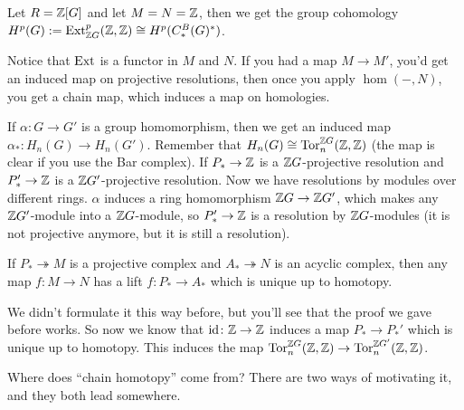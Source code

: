 \begin{example}
 Let $R=\mathbb{Z}[G]$ and let $M=N=\mathbb{Z}$, then we get the group cohomology $H^p(G):=\operatorname{Ext}^p_{\mathbb{Z} G}(\mathbb{Z},\mathbb{Z})\cong H^p(C_*^B(G)^*)$.
\end{example}

Notice that $\operatorname{Ext}$ is a functor in $M$ and $N$. If you had a map $M\to M'$, you'd get an induced map on projective resolutions, then once you apply $\hom(-,N)$, you get a chain map, which induces a map on homologies.

If $\alpha\colon G\to G'$ is a group homomorphism, then we get an induced map $\alpha_*\colon H_n(G)\to H_n(G')$. Remember that $H_n(G)\cong \operatorname{Tor}^{\mathbb{Z} G}_n(\mathbb{Z},\mathbb{Z})$ (the map is clear if you use the Bar complex). If $P_*\to \mathbb{Z}$ is a $\mathbb{Z} G$-projective resolution and $P'_*\to \mathbb{Z}$ is a $\mathbb{Z} G'$-projective resolution. Now we have resolutions by modules over different rings. $\alpha$ induces a ring homomorphism $\mathbb{Z} G\to \mathbb{Z} G'$, which makes any $\mathbb{Z} G'$-module into a $\mathbb{Z} G$-module, so $P_*'\to \mathbb{Z}$ is a resolution by $\mathbb{Z} G$-modules (it is not projective anymore, but it is still a resolution).
\begin{lemma}
 If $P_*\twoheadrightarrow M$ is a projective complex and $A_*\twoheadrightarrow N$ is an acyclic complex, then any map $f\colon M\to N$ has a lift $f\colon P_*\to A_*$ which is unique up to homotopy.
\end{lemma}
We didn't formulate it this way before, but you'll see that the proof we gave before works. So now we know that $\operatorname{id}\colon \mathbb{Z}\to \mathbb{Z}$ induces a map $P_*\to P_*'$ which is unique up to homotopy. This induces the map $\operatorname{Tor}^{\mathbb{Z} G}_n(\mathbb{Z},\mathbb{Z})\to \operatorname{Tor}^{\mathbb{Z} G'}_n(\mathbb{Z}, \mathbb{Z})$.

\bigskip

Where does ``chain homotopy'' come from? There are two ways of motivating it, and they both lead somewhere.

